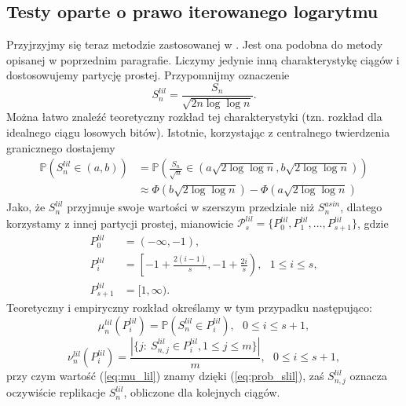 \documentclass[a4paper,11pt,oneside]{book}
\newcommand{\Pro}[1]{\mathbb{P}\left(#1\right)}
\newcommand{\Slil}[1]{S^{lil}_#1}
\newcommand{\Sasin}[1]{S^{asin}_#1}
\theoremstyle{definition}
\begin{document}
\subsection{Testy oparte o prawo iterowanego logarytmu}
Przyjrzyjmy się teraz metodzie zastosowanej w \cite{wang-nic}. Jest ona podobna do metody opisanej w poprzednim paragrafie. Liczymy jedynie inną charakterystykę ciągów i dostosowujemy partycję prostej. Przypomnijmy oznaczenie
\begin{equation}
\Slil{n} = \frac{S_n}{\sqrt{2n \log \log n}}.
\end{equation}
Można łatwo znaleźć teoretyczny rozkład tej charakterystyki (tzn. rozkład dla idealnego ciągu losowych bitów). Istotnie, korzystając z centralnego twierdzenia granicznego dostajemy
\begin{equation}
\begin{split}
  \label{eq:prob_slil}
 \Pro{\Slil{n} \in (a,b)} &= \Pro{\frac{S_n}{\sqrt{n}} \in \left(a\sqrt{2 \log \log n},  b\sqrt{2 \log \log n}\right)}\\
 &\approx \Phi(b\sqrt{2 \log \log n}) - \Phi(a\sqrt{2 \log \log n})
\end{split}
\end{equation}
Jako, że $\Slil{n}$ przyjmuje swoje wartości w szerszym przedziale niż $\Sasin{n}$, dlatego korzystamy z innej partycji prostej, mianowicie $\mathcal{P}^{lil}_s = \{ P^{lil}_0, P^{lil}_1, \ldots, P^{lil}_{s+1}\}$, gdzie
\begin{equation*}
\begin{split}
  P^{lil}_0 &= (-\infty, -1),\\
  P^{lil}_i &= \left[-1 + \frac{2(i-1)}{s}, -1 + \frac{2i}{s} \right),\ \ \ 1 \leq i \leq s,\\
  P^{lil}_{s+1} &= [1, \infty).
\end{split}
\end{equation*}
Teoretyczny i empiryczny rozkład określamy w tym przypadku następująco:
\begin{equation}
 \label{eq:mu_lil}
 \mu^{lil}_n \left( P^{lil}_i \right) = \Pro{\Slil{n} \in P^{lil}_i},\ \ \ 0 \leq i \leq s+1,
\end{equation}
\begin{equation}
 \nu^{lil}_n \left( P^{lil}_i \right) = \frac{|\{ j:\ \Slil{{n,j}} \in  P^{lil}_i, 1 \leq j \leq m\}|}{m},\ \ \ 0 \leq i \leq s+1,
\end{equation}
przy czym wartość (\ref{eq:mu_lil}) znamy dzięki (\ref{eq:prob_slil}), zaś $\Slil{{n,j}}$ oznacza oczywiście replikacje $\Slil{n}$, obliczone dla kolejnych ciągów.
\end{document}
